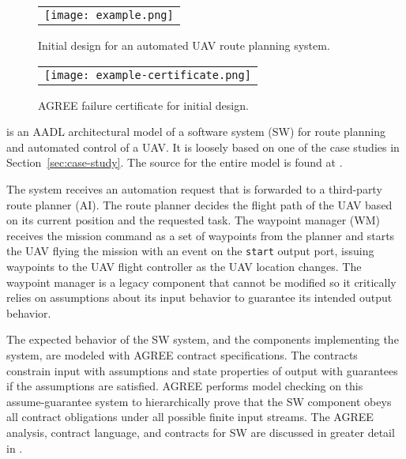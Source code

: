 \begin{figure*}[h]
  \begin{center}
    \begin{tabular}{c}
      \texttt{[image: example.png]}
    \end{tabular}
  \end{center}
\caption{Initial design for an automated UAV route planning system.}
\label{fig:example}
\end{figure*}

\begin{figure}
  \begin{center}
    \begin{tabular}{c}
      \texttt{[image: example-certificate.png]} \\
    \end{tabular}
  \end{center}
\caption{AGREE failure certificate for initial design.}
\label{fig:example-certificate}
\end{figure}

 is an AADL architectural model of a software
system (SW) for route planning and automated control of a UAV.  It is
loosely based on one of the case studies in
Section~\ref{sec:case-study}.  The source for the entire model is
found at \cite{repo}.

The system receives an automation request that is forwarded to a
third-party route planner (AI).  The route planner decides the flight
path of the UAV based on its current position and the requested task.
The waypoint manager (WM) receives the mission command as a set of
waypoints from the planner and starts the UAV flying the mission with an event on the \texttt{start} output port,
issuing waypoints to the UAV flight controller as the UAV location
changes.  The waypoint manager is a legacy component that cannot be
modified so it critically relies on assumptions about its input behavior to guarantee its intended output behavior.

The expected behavior of the SW system, and the components
implementing the system, are modeled with AGREE contract
specifications.  The contracts constrain input with assumptions and
state properties of output with guarantees if the assumptions are satisfied.  AGREE performs model
checking on this assume-guarantee system to hierarchically prove that
the SW component obeys all contract obligations under all possible finite input
streams.  The AGREE analysis, contract language, and contracts for SW
are discussed in greater detail in .

